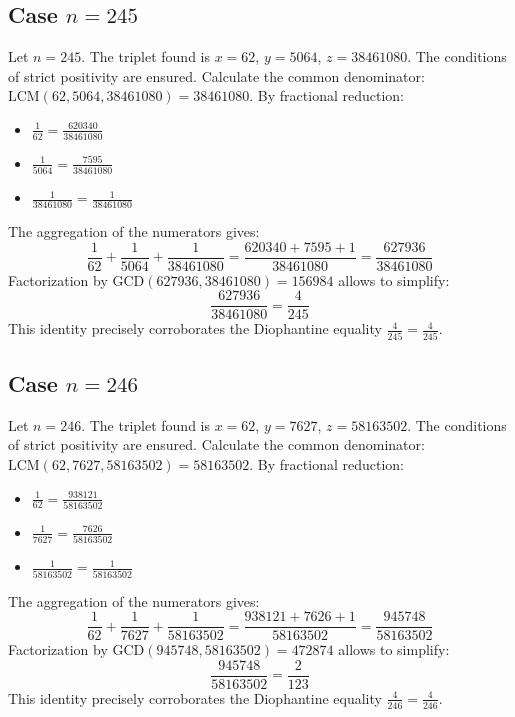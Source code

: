 \documentclass[11pt,a4paper]{article}
\begin{document}
\subsection{Case $n = 245$}
Let $n = 245$. The triplet found is $x = 62$, $y = 5064$, $z = 38461080$.
The conditions of strict positivity are ensured.
Calculate the common denominator: $\text{LCM}(62, 5064, 38461080) = 38461080$.
By fractional reduction:
\begin{itemize}
    \item $\frac{1}{62} = \frac{620340}{38461080}$
    \item $\frac{1}{5064} = \frac{7595}{38461080}$
    \item $\frac{1}{38461080} = \frac{1}{38461080}$
\end{itemize}
The aggregation of the numerators gives:
$$ \frac{1}{62} + \frac{1}{5064} + \frac{1}{38461080} = \frac{620340 + 7595 + 1}{38461080} = \frac{627936}{38461080} $$
Factorization by $\text{GCD}(627936, 38461080) = 156984$ allows to simplify:
$$ \frac{627936}{38461080} = \frac{4}{245} $$
This identity precisely corroborates the Diophantine equality $\frac{4}{245} = \frac{4}{245}$.

\subsection{Case $n = 246$}
Let $n = 246$. The triplet found is $x = 62$, $y = 7627$, $z = 58163502$.
The conditions of strict positivity are ensured.
Calculate the common denominator: $\text{LCM}(62, 7627, 58163502) = 58163502$.
By fractional reduction:
\begin{itemize}
    \item $\frac{1}{62} = \frac{938121}{58163502}$
    \item $\frac{1}{7627} = \frac{7626}{58163502}$
    \item $\frac{1}{58163502} = \frac{1}{58163502}$
\end{itemize}
The aggregation of the numerators gives:
$$ \frac{1}{62} + \frac{1}{7627} + \frac{1}{58163502} = \frac{938121 + 7626 + 1}{58163502} = \frac{945748}{58163502} $$
Factorization by $\text{GCD}(945748, 58163502) = 472874$ allows to simplify:
$$ \frac{945748}{58163502} = \frac{2}{123} $$
This identity precisely corroborates the Diophantine equality $\frac{4}{246} = \frac{4}{246}$.
\end{document}
